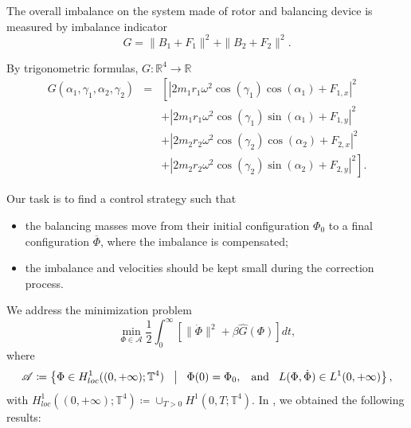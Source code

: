 \documentclass{aims}
\theoremstyle{definition}
\begin{document}
	The overall imbalance on the system made of rotor and balancing device is measured by imbalance indicator
	\begin{equation*}
	G=\|B_1+F_1\|^2+\|B_2+F_2\|^2.
	\end{equation*}
	
	By trigonometric formulas,
	$G:\mathbb{R}^4\longrightarrow \mathbb{R}$
	\begin{eqnarray}\label{G}
	G(\alpha_1,\gamma_1,\alpha_2,\gamma_2)&=&\left[\left|2m_1r_1\omega^2\cos(\gamma_1)\cos(\alpha_1)+F_{1,x}\right|^2\right.\\
	&\;&+\left|2m_1r_1\omega^2\cos(\gamma_1)\sin(\alpha_1)+F_{1,y}\right|^2\nonumber\\
	&\;&+\left|2m_2r_2\omega^2\cos(\gamma_2)\cos(\alpha_2)+F_{2,x}\right|^2\nonumber\\
	&\;&\left.+\left|2m_2r_2\omega^2\cos(\gamma_2)\sin(\alpha_2)+F_{2,y}\right|^2\right].\nonumber
	\end{eqnarray}
	
	Our task is to find a control strategy such that
	\begin{itemize}
		\item the balancing masses move from their initial configuration $\Phi_0$ to a final configuration $\overline{\Phi}$, where the imbalance is compensated;
		\item the imbalance and velocities should be kept small during the correction process.
	\end{itemize}
	
	We address the minimization problem
	\begin{equation}\label{functional}
	\min_{\Phi\in\mathscr{A}} \frac{1}{2}\int_0^{\infty} \left[\|\dot{\Phi}\|^2+{\beta}\hat{G}(\Phi)\right] dt,
	\end{equation}
	where
	\begin{equation}\label{admissible_trajectories}
	\mathscr{A}\coloneqq \left\{\Phi\in H^1_{loc}((0,+\infty);\mathbb{T}^4) \hspace{0.3 cm} \big| \hspace{0.3 cm} \Phi(0)=\Phi_0,\hspace{0.3 cm}\mbox{and}\hspace{0.3 cm}L(\Phi,\dot{\Phi})\in L^1(0,+\infty)\right\},
	\end{equation}
	with $H^1_{loc}((0,+\infty);\mathbb{T}^4)\coloneqq \cup_{T>0}H^1(0,T;\mathbb{T}^4)$. In \cite{RIO}, we obtained the following results:
	
\end{document}
